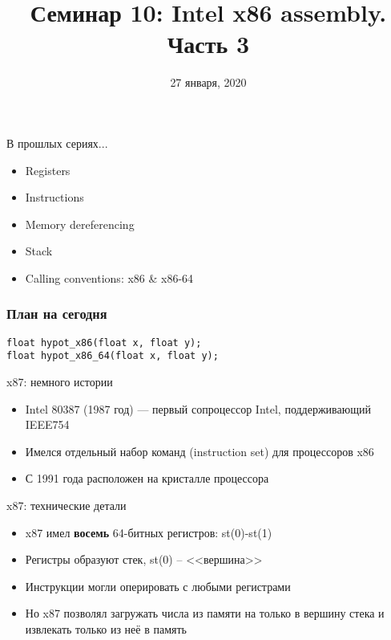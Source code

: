 \documentclass[10pt,pdf,hyperref={unicode}]{beamer}
\title{Семинар 10: Intel x86 assembly. Часть 3}
\date{27 января, 2020}
\newcommand{\asm}[1]{\colorbox{shadecolor}{#1}}
\begin{document}
\begin{frame}
  \titlepage
\end{frame}

\begin{frame}{В прошлых сериях...}
\begin{itemize}
    \item Registers
    \item Instructions
    \item Memory dereferencing
    \item Stack
    \item Calling conventions: x86 \& x86-64
\end{itemize}
\end{frame}

\begin{frame}[fragile]
\frametitle{План на сегодня}
\begin{center}
    \begin{minipage}{0.65\textwidth}
        \begin{verbatim}
float hypot_x86(float x, float y);
float hypot_x86_64(float x, float y);
        \end{verbatim}
    \end{minipage}
\end{center}
\end{frame}

\begin{frame}{x87: немного истории}
\begin{itemize}
    \item Intel 80387 (1987 год) — первый сопроцессор Intel, поддерживающий IEEE754
    \item Имелся отдельный набор команд (instruction set) для процессоров x86
    \item С 1991 года расположен на кристалле процессора
\end{itemize}
\end{frame}

\begin{frame}{x87: технические детали}
\begin{itemize}
    \item x87 имел \textbf{восемь} 64-битных регистров: \asm{st(0)}-\asm{st(1)}
    \item Регистры образуют стек, \asm{st(0)} -- <<вершина>>
    \item Инструкции могли оперировать с любыми регистрами
    \item Но x87 позволял загружать числа из памяти на только в вершину стека и извлекать только из неё в память
\end{itemize}
\end{frame}
\end{document}
